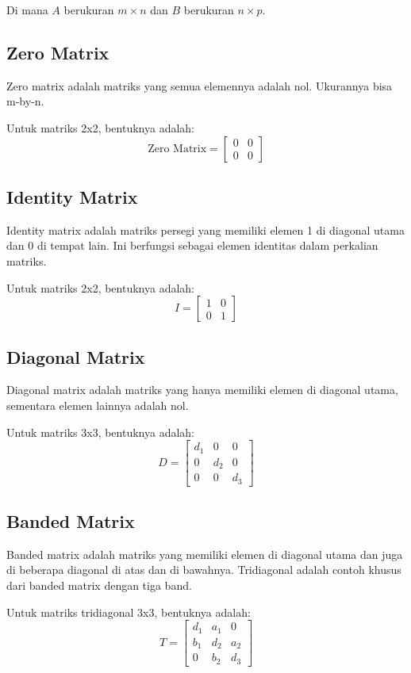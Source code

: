 \documentclass{article}
\begin{document}
Di mana \( A \) berukuran \( m \times n \) dan \( B \) berukuran \( n \times p \).

\subsection{Zero Matrix}
Zero matrix adalah matriks yang semua elemennya adalah nol. Ukurannya bisa m-by-n.

Untuk matriks 2x2, bentuknya adalah:
\[ \text{Zero Matrix} = \begin{bmatrix} 0 & 0 \\ 0 & 0 \end{bmatrix} \]

\subsection{Identity Matrix}
Identity matrix adalah matriks persegi yang memiliki elemen 1 di diagonal utama dan 0 di tempat lain. Ini berfungsi sebagai elemen identitas dalam perkalian matriks.

Untuk matriks 2x2, bentuknya adalah:
\[ I = \begin{bmatrix} 1 & 0 \\ 0 & 1 \end{bmatrix} \]

\subsection{Diagonal Matrix}
Diagonal matrix adalah matriks yang hanya memiliki elemen di diagonal utama, sementara elemen lainnya adalah nol.

Untuk matriks 3x3, bentuknya adalah:
\[ D = \begin{bmatrix} d_1 & 0 & 0 \\ 0 & d_2 & 0 \\ 0 & 0 & d_3 \end{bmatrix} \]

\subsection{Banded Matrix}
Banded matrix adalah matriks yang memiliki elemen di diagonal utama dan juga di beberapa diagonal di atas dan di bawahnya. Tridiagonal adalah contoh khusus dari banded matrix dengan tiga band.

Untuk matriks tridiagonal 3x3, bentuknya adalah:
\[ T = \begin{bmatrix} d_1 & a_1 & 0 \\ b_1 & d_2 & a_2 \\ 0 & b_2 & d_3 \end{bmatrix} \]
\end{document}
